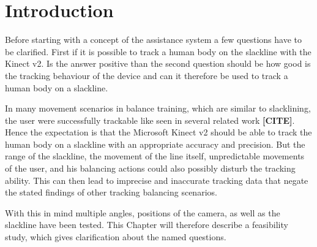 \section{Introduction}

Before starting with a concept of the assistance system a few questions have to be clarified. First if it is possible to track a human body on the slackline with the Kinect v2. Is the answer positive than the second question should be how good is the tracking behaviour of the device and can it therefore be used to track a human body on a slackline.

In many movement scenarios in balance training, which are similar to slacklining, the user were successfully trackable like seen in several related work \textbf{[CITE]}. Hence the expectation is that the Microsoft Kinect v2 should be able to track the human body on a slackline with an appropriate accuracy and precision. But the range of the slackline, the movement of the line itself, unpredictable movements of the user, and his balancing actions could also possibly disturb the tracking ability. This can then lead to imprecise and inaccurate tracking data that negate the stated findings of other tracking balancing scenarios.

With this in mind multiple angles, positions of the camera, as well as the slackline have been tested. This Chapter will therefore describe a feasibility study, which gives clarification about the named questions. 

